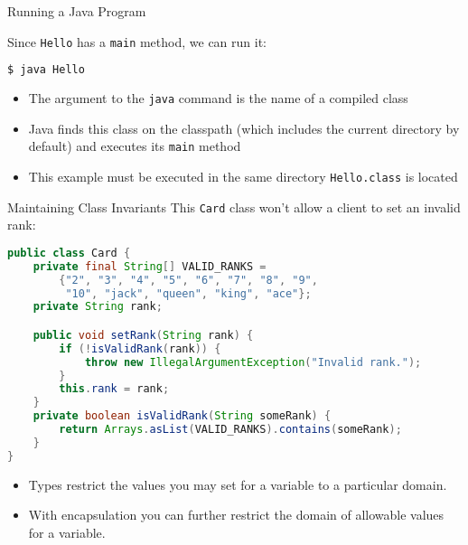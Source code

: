 \documentclass{beamer}
\begin{document}
\begin{frame}[fragile]{Running a Java Program}


Since {\tt Hello} has a {\tt main} method, we can run it:
\begin{lstlisting}[language=Java]
$ java Hello
\end{lstlisting}
\begin{itemize}
\item The argument to the {\tt java} command is the name of a compiled class
\item Java finds this class on the classpath (which includes the current directory by default) and executes its {\tt main} method
\item This example must be executed in the same directory {\tt Hello.class} is located
\end{itemize}



\end{frame}

\begin{frame}[fragile]{Maintaining Class Invariants}
\vspace{-.05in}
This {\tt Card} class won't allow a client to set an invalid rank:
\vspace{-.05in}
\begin{lstlisting}[language=Java]
public class Card {
    private final String[] VALID_RANKS =
        {"2", "3", "4", "5", "6", "7", "8", "9",
         "10", "jack", "queen", "king", "ace"};
    private String rank;

    public void setRank(String rank) {
        if (!isValidRank(rank)) {
            throw new IllegalArgumentException("Invalid rank.");
        }
        this.rank = rank;
    }
    private boolean isValidRank(String someRank) {
        return Arrays.asList(VALID_RANKS).contains(someRank);
    }
}
\end{lstlisting}
\vspace{-.05in}
\begin{itemize}
\item Types restrict the values you may set for a variable to a particular domain.
\item With encapsulation you can further restrict the domain of allowable values for a variable.
\end{itemize}

\end{frame}
\end{document}
